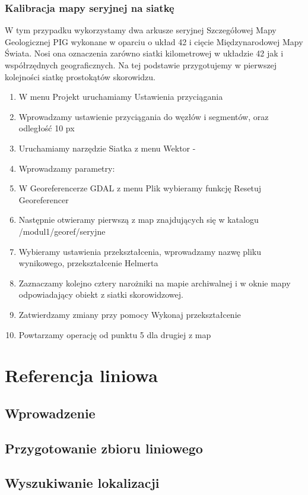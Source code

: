 \documentclass[a4paper,11pt, onecolumn, openany]{memoir}
\begin{document}
    \subsection{Kalibracja mapy seryjnej na siatkę}
W tym przypadku wykorzystamy dwa arkusze seryjnej Szczegółowej Mapy Geologicznej PIG wykonane w oparciu o układ 42 i cięcie Międzynarodowej Mapy Świata. Nosi ona oznaczenia zarówno siatki kilometrowej w układzie 42 jak i współrzędnych geograficznych. Na tej podstawie przygotujemy w pierwszej kolejności siatkę prostokątów skorowidzu.
		\begin{enumerate}
		\item W menu Projekt uruchamiamy Ustawienia przyciągania
		\item Wprowadzamy ustawienie przyciągania do węzłów i segmentów, oraz odległość 10 px
		\item Uruchamiamy narzędzie Siatka z menu Wektor -
		\item Wprowadzamy parametry:
		\item W Georeferencerze GDAL z menu Plik wybieramy funkcję Resetuj Georeferencer
		\item Następnie otwieramy pierwszą z map znajdujących się w katalogu /modul1/georef/seryjne
		\item Wybieramy ustawienia przekształcenia, wprowadzamy nazwę pliku wynikowego, przekształcenie Helmerta
		\item Zaznaczamy kolejno cztery narożniki na mapie archiwalnej i w oknie mapy odpowiadający obiekt z siatki skorowidzowej.
		\item Zatwierdzamy zmiany przy pomocy Wykonaj przekształcenie
		\item Powtarzamy operację od punktu 5 dla drugiej z map
		\end{enumerate}

	\chapter{Referencja liniowa}
		\section{Wprowadzenie}
		\section{Przygotowanie zbioru liniowego}
		\section{Wyszukiwanie lokalizacji}
\end{document}
